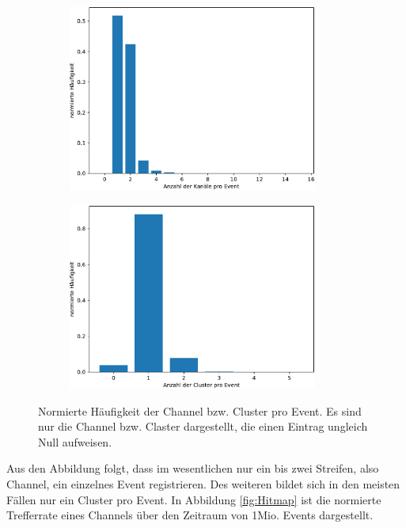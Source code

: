 \begin{figure}[H]
\centering
\begin{subfigure}{.5\textwidth}
	\centering
	\includegraphics[width=0.9\textwidth]{build/Quellenmessung_frequeny_channel.pdf}
	\caption{}
	\label{fig:frequency_channel}
\end{subfigure}%
\begin{subfigure}{.5\textwidth}
	\centering
	\includegraphics[width=0.9\textwidth]{build/Quellenmessung_frequeny_cluster.pdf}
	\caption{}
	\label{fig:frequency_cluster}
\end{subfigure}
\caption{Normierte Häufigkeit der Channel bzw. Cluster pro Event. Es sind nur die Channel bzw. Claster dargestellt, die einen Eintrag ungleich Null aufweisen.}
\label{fig:großer_quellenscan_1}
\end{figure}

Aus den Abbildung folgt, dass im wesentlichen nur ein bis zwei Streifen, also Channel, ein einzelnes Event registrieren. Des weiteren bildet sich in den meisten Fällen nur ein Cluster pro Event. In Abbildung \ref{fig:Hitmap} ist die normierte Trefferrate eines Channels über den Zeitraum von 1Mio. Events dargestellt.


